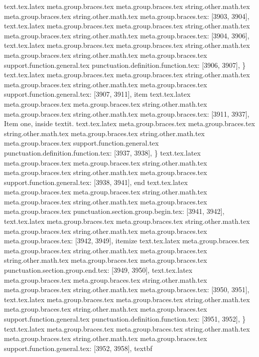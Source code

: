 {{{{{{{{{{{{{{{{{{{{{{{{{{{{{{{{{{{{{{{{{{{{{{{{{{{{{{{{{{{{{{{{{{{{{{{{{{{{{{{{{{{{{{{{{{{{{{{{{{{{{{{{{{{{{{{{{{{{{{{{{{{{text.tex.latex meta.group.braces.tex meta.group.braces.tex string.other.math.tex meta.group.braces.tex string.other.math.tex meta.group.braces.tex: [3903, 3904], {
}
text.tex.latex meta.group.braces.tex meta.group.braces.tex string.other.math.tex meta.group.braces.tex string.other.math.tex meta.group.braces.tex: [3904, 3906], {  }
text.tex.latex meta.group.braces.tex meta.group.braces.tex string.other.math.tex meta.group.braces.tex string.other.math.tex meta.group.braces.tex support.function.general.tex punctuation.definition.function.tex: [3906, 3907], {\}
text.tex.latex meta.group.braces.tex meta.group.braces.tex string.other.math.tex meta.group.braces.tex string.other.math.tex meta.group.braces.tex support.function.general.tex: [3907, 3911], {item}
text.tex.latex meta.group.braces.tex meta.group.braces.tex string.other.math.tex meta.group.braces.tex string.other.math.tex meta.group.braces.tex: [3911, 3937], { Item one, inside textit.
}
text.tex.latex meta.group.braces.tex meta.group.braces.tex string.other.math.tex meta.group.braces.tex string.other.math.tex meta.group.braces.tex support.function.general.tex punctuation.definition.function.tex: [3937, 3938], {\}
text.tex.latex meta.group.braces.tex meta.group.braces.tex string.other.math.tex meta.group.braces.tex string.other.math.tex meta.group.braces.tex support.function.general.tex: [3938, 3941], {end}
text.tex.latex meta.group.braces.tex meta.group.braces.tex string.other.math.tex meta.group.braces.tex string.other.math.tex meta.group.braces.tex meta.group.braces.tex punctuation.section.group.begin.tex: [3941, 3942], {{}
text.tex.latex meta.group.braces.tex meta.group.braces.tex string.other.math.tex meta.group.braces.tex string.other.math.tex meta.group.braces.tex meta.group.braces.tex: [3942, 3949], {itemize}
text.tex.latex meta.group.braces.tex meta.group.braces.tex string.other.math.tex meta.group.braces.tex string.other.math.tex meta.group.braces.tex meta.group.braces.tex punctuation.section.group.end.tex: [3949, 3950], {}}
text.tex.latex meta.group.braces.tex meta.group.braces.tex string.other.math.tex meta.group.braces.tex string.other.math.tex meta.group.braces.tex: [3950, 3951], {
}
text.tex.latex meta.group.braces.tex meta.group.braces.tex string.other.math.tex meta.group.braces.tex string.other.math.tex meta.group.braces.tex support.function.general.tex punctuation.definition.function.tex: [3951, 3952], {\}
text.tex.latex meta.group.braces.tex meta.group.braces.tex string.other.math.tex meta.group.braces.tex string.other.math.tex meta.group.braces.tex support.function.general.tex: [3952, 3958], {textbf}
}}}}}}}}}}}}}}}}}}}}}}}}}}}}}}}}}}}}}}}}}}}}}}}}}}}}}}}}}}}}}}}}}}}}}}}}}}}}}}}}}}}}}}}}}}}}}}}}}}}}}}}}}}}}}}}}}}}}}}}}}}}}}}}
